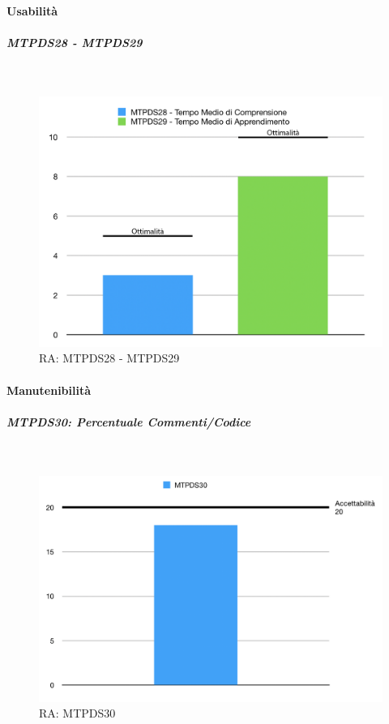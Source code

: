 \paragraph{Usabilità}

\subparagraph{MTPDS28 - MTPDS29} \-\\

\begin{figure}[H]
	\begin{center}
		\includegraphics[scale=0.5]{./images/grafici_RA/Usabilita.png} 
		\caption{RA: MTPDS28 - MTPDS29}
	\end{center}
\end{figure}

\pagebreak

\paragraph{Manutenibilità} 

\subparagraph{MTPDS30: Percentuale Commenti/Codice} \-\\

\begin{figure}[H]
	\begin{center}
		\includegraphics[scale=0.5]{./images/grafici_RA/MTPDS30.png} 
		\caption{RA: MTPDS30}
	\end{center}
\end{figure}